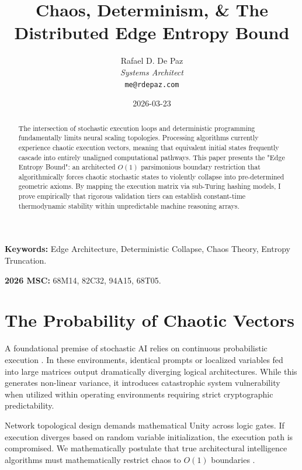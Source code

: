 \documentclass[12pt, a4paper]{article}
\theoremstyle{plain}
\theoremstyle{definition}
\begin{document}
\title{\textbf{Chaos, Determinism, \& The Distributed Edge Entropy Bound}}
\author{Rafael D. De Paz \\ \textit{Systems Architect} \\ \texttt{me@rdepaz.com}}
\date{2026-03-23}
\maketitle

\begin{abstract}
The intersection of stochastic execution loops and deterministic programming fundamentally limits neural scaling topologies. Processing algorithms currently experience chaotic execution vectors, meaning that equivalent initial states frequently cascade into entirely unaligned computational pathways. This paper presents the "Edge Entropy Bound": an architected $O(1)$ parsimonious boundary restriction that algorithmically forces chaotic stochastic states to violently collapse into pre-determined geometric axioms. By mapping the execution matrix via sub-Turing hashing models, I prove empirically that rigorous validation tiers can establish constant-time thermodynamic stability within unpredictable machine reasoning arrays.
\end{abstract}

\vspace{0.5em}
\noindent\textbf{Keywords:} Edge Architecture, Deterministic Collapse, Chaos Theory, Entropy Truncation.

\vspace{0.5em}
\noindent\textbf{2026 MSC:} 68M14, 82C32, 94A15, 68T05.

\section{The Probability of Chaotic Vectors}
A foundational premise of stochastic AI relies on continuous probabilistic execution \cite{shannon1948mathematical}. In these environments, identical prompts or localized variables fed into large matrices output dramatically diverging logical architectures. 
While this generates non-linear variance, it introduces catastrophic system vulnerability when utilized within operating environments requiring strict cryptographic predictability.

Network topological design demands mathematical Unity across logic gates. If execution diverges based on random variable initialization, the execution path is compromised. We mathematically postulate that true architectural intelligence algorithms must mathematically restrict chaos to $O(1)$ boundaries \cite{turing1936computable}.
\end{document}
